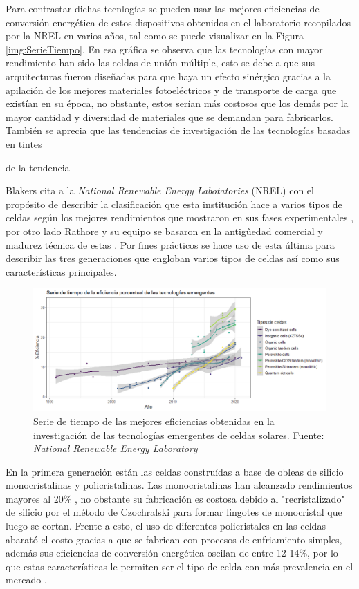 Para contrastar dichas tecnlogías se pueden usar las mejores eficiencias de conversión energética de estos dispositivos obtenidos en el laboratorio recopilados por la NREL en varios años, tal como se puede visualizar en la Figura \ref{img:SerieTiempo}. En esa gráfica se observa que las tecnologías con mayor rendimiento han sido las celdas de unión múltiple, esto se debe a que sus arquitecturas fueron diseñadas para que haya un efecto sinérgico gracias a la apilación de los mejores materiales fotoeléctricos y de transporte de carga que existían en su época, no obstante, estos serían más costosos que los demás por la mayor cantidad y diversidad de materiales que se demandan para fabricarlos. También se aprecia que las tendencias de investigación de las tecnologías basadas en tintes

de la tendencia 


Blakers cita a la 
\textit{National Renewable Energy Labotatories} (NREL) con el propósito de describir la clasificación que esta institución hace a varios tipos de celdas  según los mejores rendimientos que mostraron en sus fases experimentales \cite{blakers2013}, por otro lado Rathore y su equipo se basaron en la antigûedad comercial y madurez técnica de estas \cite{rathore2021}. Por fines prácticos se hace uso de esta última para describir las tres generaciones que engloban varios tipos de celdas así como sus características principales. 

\begin{figure}[h!]
    \label{img:SerieEmergente}
    \includegraphics[scale=0.6]{img/SeriesEmergentes.png}
    \caption{Serie de tiempo de las mejores eficiencias obtenidas en la investigación de las tecnologías emergentes de celdas solares.
    Fuente: \textit{National Renewable Energy Laboratory} \cite{owidenergy}}
\end{figure}

En la primera generación están las celdas construídas a base de obleas de silicio monocristalinas y policristalinas. Las monocristalinas han alcanzado rendimientos mayores al 20\% \cite{gul2016}, no obstante su fabricación es costosa  \cite{srinivas2015review} debido al "recristalizado" de silicio por el método de Czochralski \cite{yu2019growth} para formar lingotes de monocristal que luego se cortan. Frente a esto, el uso de diferentes policristales en las celdas abarató el costo gracias a que se fabrican con procesos de enfriamiento simples, además sus eficiencias de conversión energética oscilan de entre 12-14\%, por lo que estas características le permiten ser el tipo de celda con más prevalencia en el mercado \cite{sharma2015solar}. 

